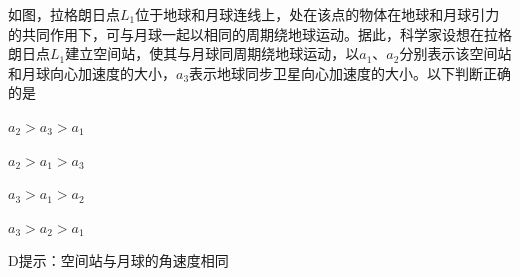 如图，拉格朗日点\(L_1\)位于地球和月球连线上，处在该点的物体在地球和月球引力的共同作用下，可与月球一起以相同的周期绕地球运动。据此，科学家设想在拉格朗日点\(L_1\)建立空间站，使其与月球同周期绕地球运动，以\(a_1\)、\(a_2\)分别表示该空间站和月球向心加速度的大小，\(a_3\)表示地球同步卫星向心加速度的大小。以下判断正确的是\paren[]

\begin{choices}
	\item \(a_2 > a_3 > a_1\)
	\item \(a_2 > a_1 > a_3\)
	\item \(a_3 > a_1 > a_2\)
	\item \(a_3 > a_2 > a_1\)
\end{choices}
\begin{answer}
	D\qquad 提示：空间站与月球的角速度相同
\end{answer}